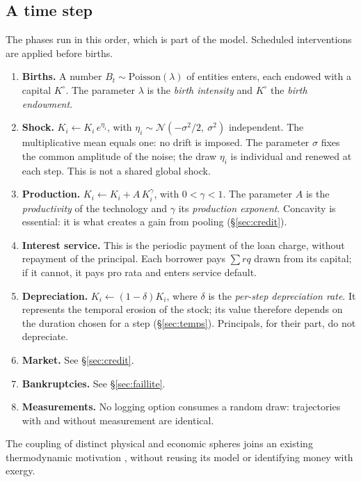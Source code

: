 \subsection{A time step}\label{sec:pas}

The phases run in this order, which is part of the model.
Scheduled interventions are applied before births.

\begin{enumerate}[label=(\roman*),leftmargin=2.2em]
\item \textbf{Births.} A number $B_t \sim \mathrm{Poisson}(\lambda)$
  of entities enters, each endowed with a capital $K^\circ$. The parameter $\lambda$ is
  the \emph{birth intensity} and $K^\circ$ the \emph{birth endowment}.
\item \textbf{Shock.} $K_i \leftarrow K_i \, e^{\eta_i}$, with
  $\eta_i \sim \mathcal{N}(-\sigma^2/2,\ \sigma^2)$ independent. The
  multiplicative mean equals one: no drift is imposed. The parameter
  $\sigma$ fixes the common amplitude of the noise; the draw $\eta_i$ is
  individual and renewed at each step. This is not a shared global
  shock.
\item \textbf{Production.} $K_i \leftarrow K_i + A\,K_i^{\gamma}$, with
  $0<\gamma<1$. The parameter $A$ is the \emph{productivity} of the
  technology and $\gamma$ its \emph{production exponent}. Concavity is
  essential: it is what creates a gain from pooling
  (\S\ref{sec:credit}).
\item \textbf{Interest service.} This is the periodic payment of the
  loan charge, without repayment of the principal. Each borrower pays
  $\sum r q$ drawn from its capital; if it cannot, it pays pro rata and
  enters service default.
\item \textbf{Depreciation.} $K_i \leftarrow (1-\delta)K_i$, where
  $\delta$ is the \emph{per-step depreciation rate}. It represents the
  temporal erosion of the stock; its value therefore depends on the
  duration chosen for a step (\S\ref{sec:temps}). Principals, for their
  part, do not depreciate.
\item \textbf{Market.} See \S\ref{sec:credit}.
\item \textbf{Bankruptcies.} See \S\ref{sec:faillite}.
\item \textbf{Measurements.} No logging option consumes a random draw:
  trajectories with and without measurement are identical.
\end{enumerate}


The coupling of distinct physical and economic spheres joins an
existing thermodynamic motivation \cite{herbert}, without reusing its
model or identifying money with exergy.

